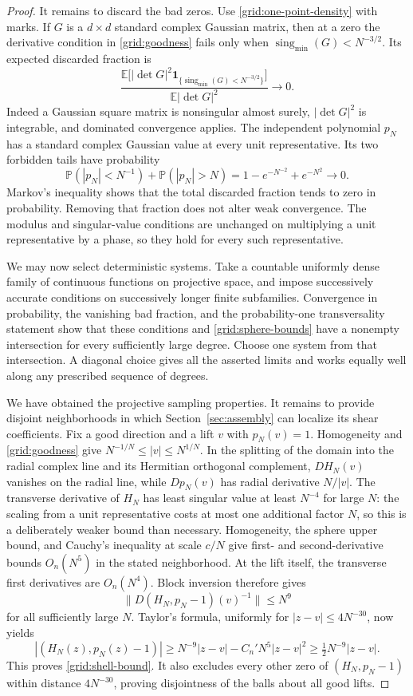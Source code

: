 \begin{proof}
It remains to discard the bad zeros.  Use
\eqref{grid:one-point-density} with marks.  If $G$ is a $d\times d$
standard complex Gaussian matrix, then at a zero the derivative
condition in \eqref{grid:goodness} fails only when
$\operatorname{sing}_{\min}(G)<N^{-3/2}$.  Its expected discarded
fraction is
\[
 \frac{\mathbb E\bigl[
       |\det G|^2
       \boldsymbol{1}_{\{\operatorname{sing}_{\min}(G)<N^{-3/2}\}}
       \bigr]}{\mathbb E|\det G|^2}
       \longrightarrow0.
\]
Indeed a Gaussian square matrix is nonsingular almost surely,
$|\det G|^2$ is integrable, and dominated convergence applies.
The independent polynomial $p_N$ has a standard complex Gaussian
value at every unit representative.  Its two forbidden tails have
probability
\[
 \mathbb P(|p_N|<N^{-1})+\mathbb P(|p_N|>N)
   =1-e^{-N^{-2}}+e^{-N^2}\longrightarrow0.
\]
Markov's inequality shows that the total discarded fraction tends
to zero in probability.  Removing that fraction does not alter weak
convergence.  The modulus and singular-value conditions are
unchanged on multiplying a unit representative by a phase, so they
hold for every such representative.

We may now select deterministic systems.  Take a countable uniformly
dense family of continuous functions on projective space, and impose
successively accurate conditions on successively longer finite
subfamilies.  Convergence in probability, the vanishing bad
fraction, and the probability-one transversality statement show that
these conditions and \eqref{grid:sphere-bounds} have a nonempty
intersection for every sufficiently large degree.  Choose one system
from that intersection.  A diagonal choice gives all the asserted
limits and works equally well along any prescribed sequence of
degrees.

We have obtained the projective sampling properties. It remains to
provide disjoint neighborhoods in which Section~\ref{sec:assembly} can
localize its shear coefficients. Fix a good direction and a lift
$v$ with $p_N(v)=1$.
Homogeneity and \eqref{grid:goodness} give
$N^{-1/N}\le |v|\le N^{1/N}$.  In the splitting of the domain into
the radial complex line and its Hermitian orthogonal complement,
$DH_N(v)$ vanishes on the radial line, while
$Dp_N(v)$ has radial derivative $N/|v|$.  The transverse derivative
of $H_N$ has least singular value at least $N^{-4}$ for large $N$:
the scaling from a unit representative costs at most one additional
factor $N$, so this is a deliberately weaker bound than necessary.
Homogeneity, the sphere upper bound, and Cauchy's inequality at
scale $c/N$ give first- and second-derivative bounds $O_n(N^5)$ in
the stated neighborhood.  At the lift itself, the transverse first
derivatives are $O_n(N^4)$.  Block inversion therefore gives
\[
 \bigl\|D(H_N,p_N-1)(v)^{-1}\bigr\|\le N^9
\]
for all sufficiently large $N$.  Taylor's formula, uniformly for
$|z-v|\le4N^{-30}$, now yields
\[
 |(H_N(z),p_N(z)-1)|
 \ge N^{-9}|z-v|-C_n' N^5|z-v|^2
 \ge\tfrac12 N^{-9}|z-v|.
\]
This proves \eqref{grid:shell-bound}.  It also excludes every other
zero of $(H_N,p_N-1)$ within distance $4N^{-30}$, proving
disjointness of the balls about all good lifts.
\end{proof}

